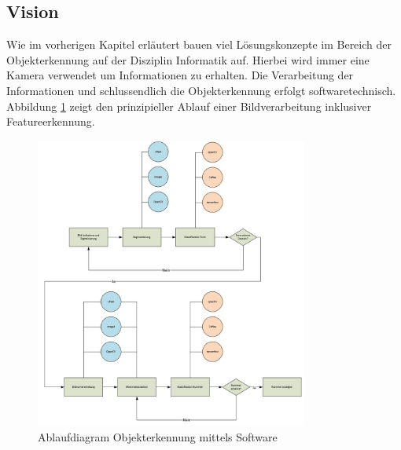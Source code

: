 \documentclass[../../main.tex]{subfiles}
\begin{document}
    \subsection{Vision}
    Wie im vorherigen Kapitel erläutert bauen viel Lösungskonzepte im Bereich
    der Objekterkennung auf der Disziplin Informatik auf. Hierbei wird immer eine Kamera
    verwendet um Informationen zu erhalten. Die Verarbeitung der Informationen und 
    schlussendlich die Objekterkennung erfolgt softwaretechnisch. Abbildung \ref{fig:vision_ablauf} 
    zeigt den prinzipieller Ablauf einer Bildverarbeitung inklusiver Featureerkennung.\\

    \begin{figure}[H] %
        \centering
        \includegraphics[width=0.8\textwidth]{Ablauf_vision.png}
        \caption{Ablaufdiagram Objekterkennung mittels Software}
        \label{fig:vision_ablauf}
    \end{figure}
    
    
    
    
    
    
\end{document}
